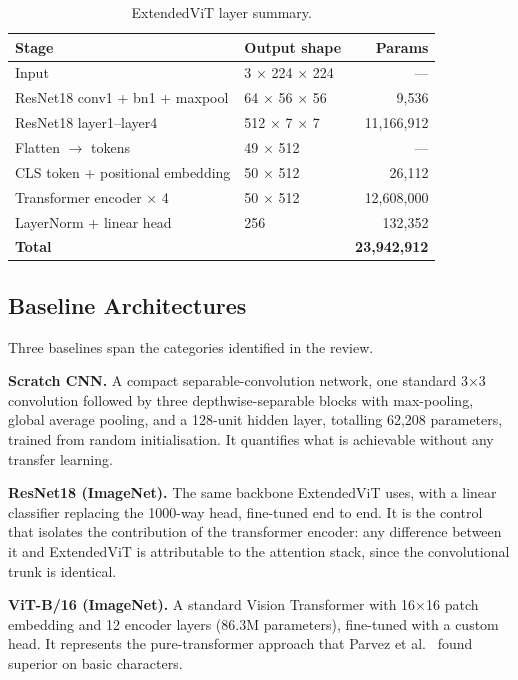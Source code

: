 \begin{table}[htbp]
\centering
\footnotesize
\caption{Extended\-Vi\-T layer summary.}
\begin{tabular}{llr}
\toprule
Stage & Output shape & Params \\
\midrule
Input & 3 × 224 × 224 & --- \\
ResNet18 conv1 + bn1 + maxpool & 64 × 56 × 56 & 9,536 \\
ResNet18 layer1--layer4 & 512 × 7 × 7 & 11,166,912 \\
Flatten \ensuremath{\rightarrow} tokens & 49 × 512 & --- \\
CLS token + positional embedding & 50 × 512 & 26,112 \\
Transformer encoder × 4 & 50 × 512 & 12,608,000 \\
LayerNorm + linear head & 256 & 132,352 \\
\textbf{Total} & & \textbf{23,942,912} \\
\bottomrule
\end{tabular}
\end{table}


\hypertarget{baseline-architectures}{%
\subsection{Baseline Architectures}\label{baseline-architectures}}

Three baselines span the categories identified in the review.

\textbf{Scratch CNN.} A compact separable-convolution network, one
standard 3×3 convolution followed by three depthwise-separable blocks
with max-pooling, global average pooling, and a 128-unit hidden layer,
totalling 62,208 parameters, trained from random initialisation. It
quantifies what is achievable without any transfer learning.

\textbf{ResNet18 (ImageNet).} The same backbone ExtendedViT uses, with a
linear classifier replacing the 1000-way head, fine-tuned end to end. It
is the control that isolates the contribution of the transformer
encoder: any difference between it and ExtendedViT is attributable to
the attention stack, since the convolutional trunk is identical.

\textbf{ViT-B/16 (ImageNet).} A standard Vision Transformer with 16×16
patch embedding and 12 encoder layers (86.3M parameters), fine-tuned
with a custom head. It represents the pure-transformer approach that
Parvez et al.~\citeyearpar{ref17} found superior on basic characters.

